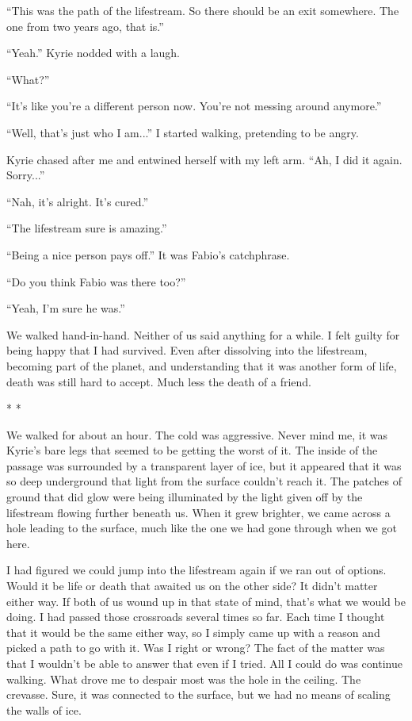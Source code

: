 \documentclass[oneside]{book}
\begin{document}
“This was the path of the lifestream. So there should be an exit somewhere. The one from two years ago, that is.”

“Yeah.” Kyrie nodded with a laugh.

“What?”

“It’s like you’re a different person now. You’re not messing around anymore.”

“Well, that’s just who I am...” I started walking, pretending to be angry.

Kyrie chased after me and entwined herself with my left arm. “Ah, I did it again. Sorry...”

“Nah, it’s alright. It’s cured.”

“The lifestream sure is amazing.”

“Being a nice person pays off.” It was Fabio’s catchphrase.

“Do you think Fabio was there too?”

“Yeah, I’m sure he was.”

We walked hand-in-hand. Neither of us said anything for a while. I felt guilty for being happy that I had survived. Even after dissolving into the lifestream, becoming part of the planet, and understanding that it was another form of life, death was still hard to accept. Much less the death of a friend.

* *

We walked for about an hour. The cold was aggressive. Never mind me, it was Kyrie’s bare legs that seemed to be getting the worst of it. The inside of the passage was surrounded by a transparent layer of ice, but it appeared that it was so deep underground that light from the surface couldn’t reach it. The patches of ground that did glow were being illuminated by the light given off by the lifestream flowing further beneath us. When it grew brighter, we came across a hole leading to the surface, much like the one we had gone through when we got here.

I had figured we could jump into the lifestream again if we ran out of options. Would it be life or death that awaited us on the other side? It didn’t matter either way. If both of us wound up in that state of mind, that’s what we would be doing. I had passed those crossroads several times so far. Each time I thought that it would be the same either way, so I simply came up with a reason and picked a path to go with it. Was I right or wrong? The fact of the matter was that I wouldn’t be able to answer that even if I tried. All I could do was continue walking. What drove me to despair most was the hole in the ceiling. The crevasse. Sure, it was connected to the surface, but we had no means of scaling the walls of ice.
\end{document}
